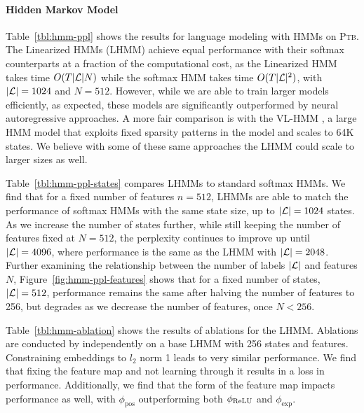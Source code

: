 \documentclass{article}
\begin{document}
\paragraph{Hidden Markov Model}
Table~\ref{tbl:hmm-ppl} shows the results for language modeling with HMMs on \textsc{Ptb}. The Linearized HMMs (LHMM) achieve equal performance with their softmax counterparts at a fraction of the computational cost, as the Linearized HMM takes time $O(T|\mathcal{L}|N)$ while the softmax HMM takes time $O(T|\mathcal{L}|^2)$, with $|\mathcal{L}|=1024$ and $N=512$. However, while we are able to train larger models efficiently, as expected, these models are significantly outperformed by neural autoregressive approaches. A more fair comparison is with the VL-HMM \citep{chiu2020scaling}, a large HMM model that exploits fixed sparsity patterns in the model and scales to 64K states. We believe with some of these same approaches the LHMM could scale to larger sizes as well.

Table~\ref{tbl:hmm-ppl-states} compares LHMMs to standard softmax HMMs. We find that for a fixed number of features $n=512$, LHMMs are able to match the performance of softmax HMMs with the same state size, up to $|\mathcal{L}|=1024$ states.
As we increase the number of states further, while still keeping the number of features fixed at $N=512$, the perplexity continues to improve up until $|\mathcal{L}|=4096$, where performance is the same as the LHMM with $|\mathcal{L}|=2048$.
Further examining the relationship between the number of labels $|\mathcal{L}|$ and features $N$, Figure~\ref{fig:hmm-ppl-features} shows that for a fixed number of states, $|\mathcal{L}|=512$, performance remains the same after halving the number of features to 256, but degrades as we decrease the number of features, once $N < 256$.

Table~\ref{tbl:hmm-ablation} shows the results of ablations for the LHMM. Ablations are conducted by independently on a base LHMM with 256 states and features. Constraining embeddings to $l_2$ norm 1 leads to very similar performance. We find that fixing the feature map and not learning through it results in a loss in performance. Additionally, we find that the form of the feature map impacts performance as well, with $\phi_{\textrm{pos}}$ outperforming both $\phi_{\mathrm{ReLU}}$ and $\phi_{\exp}$.
\end{document}
